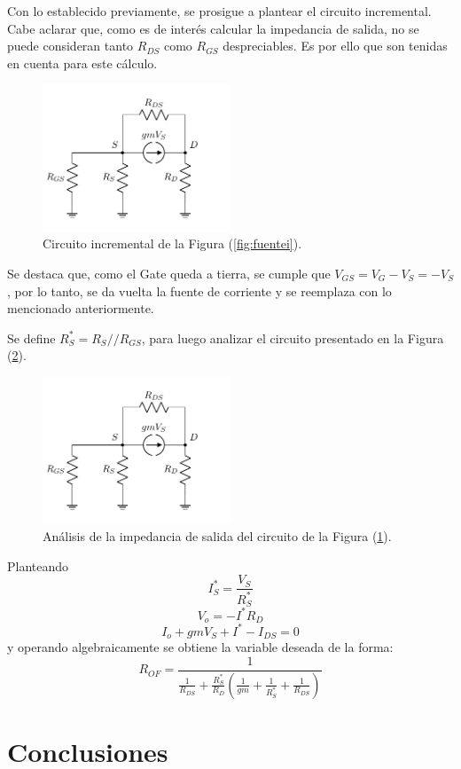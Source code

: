 Con lo establecido previamente, se prosigue a plantear el circuito incremental. Cabe aclarar que, como es de interés calcular la impedancia de salida, no se puede consideran tanto $R_{DS}$ como $R_{GS}$ despreciables. Es por ello que son tenidas en cuenta para este cálculo.
\begin{figure}[H]
\centering
	\includegraphics[width=0.5\textwidth, page=1]{Imagenes/ModeloIncremental.pdf}
	\caption{Circuito incremental de la Figura (\ref{fig:fuentei}).}
\label{fig:incfuente1}
\end{figure}

Se destaca que, como el Gate queda a tierra, se cumple que $V_{GS} = V_G - V_S = - V_S$, por lo tanto, se da vuelta la fuente de corriente y se reemplaza con lo mencionado anteriormente. 

Se define $R_S^* = R_S // R_{GS}$, para luego analizar el circuito presentado en la Figura (\ref{fig:incfuente2}).
\begin{figure}[H]
\centering
	\includegraphics[width=0.5\textwidth, page=2]{Imagenes/ModeloIncremental.pdf}
	\caption{Análisis de la impedancia de salida del circuito de la Figura (\ref{fig:incfuente1}).}
\label{fig:incfuente2}
\end{figure}

Planteando
\begin{equation*}
	I_S^* = \frac{V_S}{R_S^*}
\end{equation*}
\begin{equation*}
	V_o = -I^* R_D
\end{equation*}
\begin{equation*}
	I_o + gm V_S + I^* - I_{DS} = 0
\end{equation*}
y operando algebraicamente se obtiene la variable deseada de la forma:
\begin{equation}
	R_{OF} = \frac{1}{\frac{1}{R_{DS}} + \frac{R_S^*}{R_D} \left( \frac{1}{gm} + \frac{1}{R_S^*} + \frac{1}{R_{DS}} \right)}
\end{equation}

\section{Conclusiones}
	
